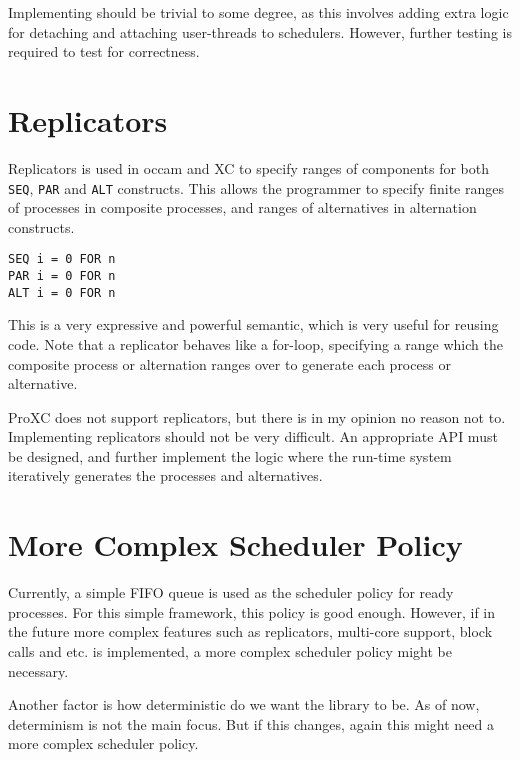 Implementing should be trivial to some degree, as this involves adding extra logic for detaching and attaching user\hyp{}threads to schedulers. However, further testing is required to test for correctness.

\section{Replicators}

Replicators is used in occam and XC to specify ranges of components for both \texttt{SEQ}, \texttt{PAR} and \texttt{ALT} constructs. This allows the programmer to specify finite ranges of processes in composite processes, and ranges of alternatives in alternation constructs. 

\begin{lstlisting}[style={CustomC},frame={},numbers={none}]
SEQ i = 0 FOR n
PAR i = 0 FOR n
ALT i = 0 FOR n
\end{lstlisting}

This is a very expressive and powerful semantic, which is very useful for reusing code. Note that a replicator behaves like a for\hyp{}loop, specifying a range which the composite process or alternation ranges over to generate each process or alternative. 

ProXC does not support replicators, but there is in my opinion no reason not to. Implementing replicators should not be very difficult. An appropriate API must be designed, and further implement the logic where the run\hyp{}time system iteratively generates the processes and alternatives.

\section{More Complex Scheduler Policy}

Currently, a simple FIFO queue is used as the scheduler policy for ready processes. For this simple framework, this policy is good enough. However, if in the future more complex features such as replicators, multi\hyp{}core support, block calls and etc. is implemented, a more complex scheduler policy might be necessary. 

Another factor is how deterministic do we want the library to be. As of now, determinism is not the main focus. But if this changes, again this might need a more complex scheduler policy. 


